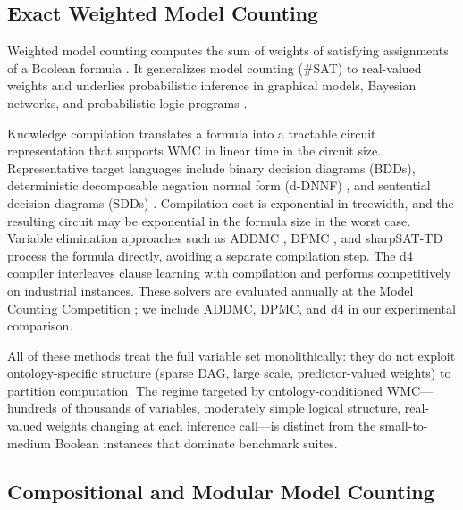 \subsection{Exact Weighted Model Counting}

Weighted model counting computes the sum of weights of satisfying
assignments of a Boolean formula \citep{chavira2008wmc}. It generalizes
model counting (\#SAT) to real-valued weights and underlies probabilistic
inference in graphical models, Bayesian networks, and probabilistic
logic programs \citep{fierens2015problog,de2007probfoil}.

Knowledge compilation translates a formula into a tractable circuit
representation that supports WMC in linear time in the circuit size.
Representative target languages include binary decision diagrams (BDDs),
deterministic decomposable negation normal form (d-DNNF)
\citep{darwiche2002kcmap}, and sentential decision diagrams (SDDs)
\citep{darwiche2011sdd}. Compilation cost is exponential in treewidth,
and the resulting circuit may be exponential in the formula size in the
worst case. Variable elimination approaches such as ADDMC
\citep{dudek2020addmc}, DPMC \citep{dudek2020dpmc}, and
sharpSAT-TD process the formula directly, avoiding a separate
compilation step. The d4 compiler \citep{lagniez2017improved}
interleaves clause learning with compilation and performs competitively
on industrial instances. These solvers are evaluated annually at the
Model Counting Competition \citep{fichte2021mcc}; we include ADDMC,
DPMC, and d4 in our experimental comparison.

All of these methods treat the full variable set monolithically: they
do not exploit ontology-specific structure (sparse DAG, large scale,
predictor-valued weights) to partition computation. The regime targeted
by ontology-conditioned WMC---hundreds of thousands of variables,
moderately simple logical structure, real-valued weights changing at
each inference call---is distinct from the small-to-medium Boolean
instances that dominate benchmark suites.


\subsection{Compositional and Modular Model Counting}

